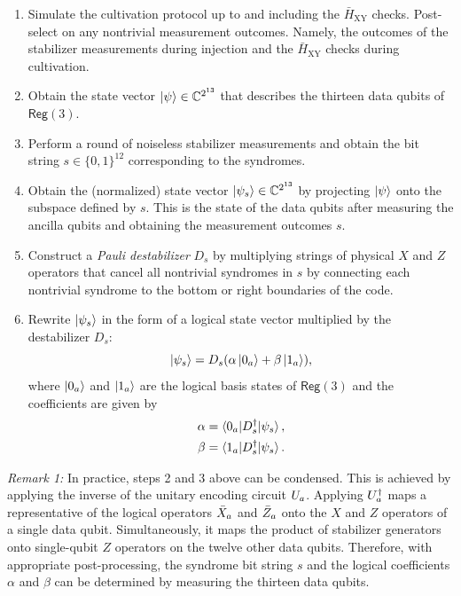 \documentclass[%
    aps, 
    physrev,
    reprint,
]{revtex4-2}
\newcommand{\reg}[1]{\mathsf{Reg}(#1)}
\newcommand{\XY}{_\mathrm{XY}}
\newcommand{\dg}{^\dagger}
\begin{document}
\begin{enumerate}

    \item  
    Simulate the cultivation protocol up to and including the $\bar H\XY$ checks.
    Post-select on any nontrivial measurement outcomes.
    Namely, the outcomes of the stabilizer measurements during injection and the $\bar H\XY$ checks during cultivation.

    \item
    Obtain the state vector $\ket{\psi}\in \mathbb{C}^{2^{13}}$ that describes the thirteen data qubits of $\reg3$.
    
    \item  
    Perform a round of noiseless stabilizer measurements and obtain the bit string $s\in\{0,1\}^{12}$ corresponding to the syndromes.

    \item 
    Obtain the (normalized) state vector $\ket{\psi_s}\in \mathbb{C}^{2^{13}}$ by projecting $\ket{\psi}$ onto the subspace defined by $s$.
    This is the state of the data qubits after measuring the ancilla qubits and obtaining the measurement outcomes $s$.
    
    \item 
    Construct a \textit{Pauli destabilizer} $D_s$ by multiplying strings of physical $X$ and $Z$ operators that cancel all nontrivial syndromes in $s$ by connecting each nontrivial syndrome to the bottom or right boundaries of the code.

    
    \item 
    Rewrite $\ket{\psi_s}$ in the form of a logical state vector multiplied by the destabilizer $D_s$:
    \begin{equation}
        \ket{\psi_s} = D_s(\alpha\ket{0_a} + \beta\ket{1_a}),
    \end{equation}
    where $\ket{0_a}$ and $\ket{1_a}$ are the logical basis states of $\reg3$ and the coefficients are given by
    \begin{align}
        \alpha = \braket{0\A|D_s\dg|\psi_s}, 
        \label{eq:logical-alpha}
        \\
        \beta = \braket{1\A|D_s\dg|\psi_s}.
        \label{eq:logical-beta}
    \end{align}
    
\end{enumerate}

\textit{Remark 1:}  In practice, steps 2 and 3 above can be condensed.
This is achieved by applying the inverse of the unitary encoding circuit $U_a$. 
Applying $U\A\dg$ maps a representative of the logical operators $\bar{X}_a$ and $\bar{Z}_a$ onto the $X$ and $Z$ operators of a single data qubit.
Simultaneously, it maps the product of stabilizer generators onto single-qubit $Z$ operators on the twelve other data qubits. 
Therefore, with appropriate post-processing, the syndrome bit string $s$ and the logical coefficients $\alpha$ and $\beta$ can be determined 
by measuring the thirteen data qubits.
\end{document}
